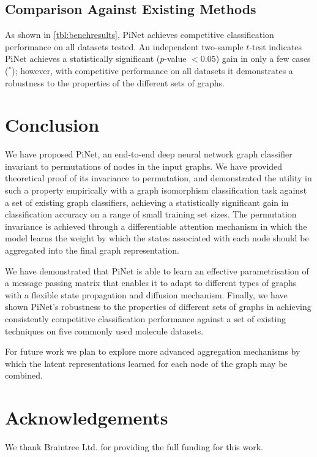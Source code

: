 \documentclass{article}
\theoremstyle{definition}
\begin{document}
\subsection{Comparison Against Existing Methods}

As shown in \autoref{tbl:benchresults}, PiNet achieves competitive classification performance on all datasets tested. An independent two-sample $t$-test indicates PiNet achieves a statistically significant ($p$-value $< 0.05$) gain in only a few cases ($^*$); however, with competitive performance on all datasets it demonstrates a robustness to the properties of the different sets of graphs.

\section{Conclusion}

We have proposed PiNet, an end-to-end deep neural network graph classifier invariant to permutations of nodes in the input graphs. We have provided theoretical proof of its invariance to permutation, and demonstrated the utility in such a property empirically with a graph isomorphism classification task against a set of existing graph classifiers, achieving a statistically significant gain in classification accuracy on a range of small training set sizes. The permutation invariance is achieved through a differentiable attention mechanism in which the model learns the weight by which the states associated with each node should be aggregated into the final graph representation.

We have demonstrated that PiNet is able to learn an effective parametrisation of a message passing matrix that enables it to adapt to different types of graphs with a flexible state propagation and diffusion mechanism. Finally, we have shown PiNet's robustness to the properties of different sets of graphs in achieving consistently competitive classification performance against a set of existing techniques on five commonly used molecule datasets.

For future work we plan to explore more advanced aggregation mechanisms by which the latent representations learned for each node of the graph may be combined.

\section*{Acknowledgements}
We thank Braintree Ltd. for providing the full funding for this work.

\appendix
\cleardoublepage


\end{document}
